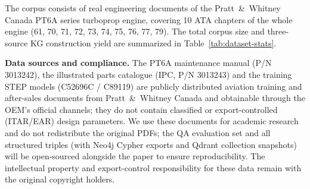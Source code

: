 \documentclass[applsci,article,submit,pdftex,moreauthors]{Definitions/mdpi}
\begin{document}
The corpus consists of real engineering documents of the Pratt~\&~Whitney Canada PT6A series turboprop engine, covering 10 ATA chapters of the whole engine (61, 70, 71, 72, 73, 74, 75, 76, 77, 79). The total corpus size and three-source KG construction yield are summarized in Table~\ref{tab:dataset-stats}.

\textbf{Data sources and compliance.} The PT6A maintenance manual (P/N 3013242), the illustrated parts catalogue (IPC, P/N 3013243) and the training STEP models (C52696C / C89119) are publicly distributed aviation training and after-sales documents from Pratt~\&~Whitney Canada and obtainable through the OEM's official channels; they do not contain classified or export-controlled (ITAR/EAR) design parameters. We use these documents for academic research and do not redistribute the original PDFs; the QA evaluation set and all structured triples (with Neo4j Cypher exports and Qdrant collection snapshots) will be open-sourced alongside the paper to ensure reproducibility. The intellectual property and export-control responsibility for these data remain with the original copyright holders.
\end{document}
